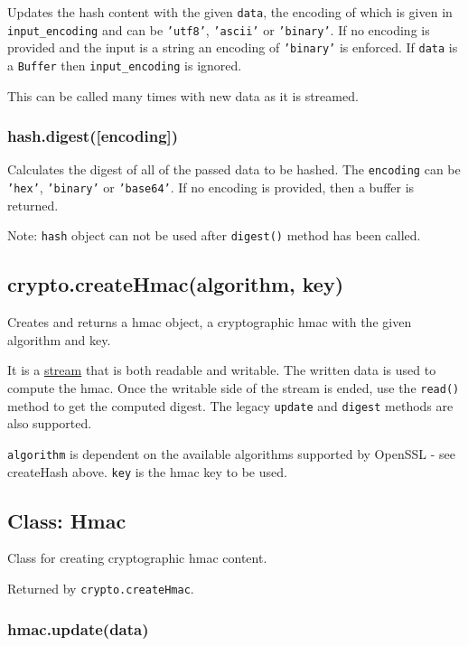 Updates the hash content with the given \texttt{data}, the encoding of
which is given in \texttt{input\_encoding} and can be \texttt{'utf8'},
\texttt{'ascii'} or \texttt{'binary'}. If no encoding is provided and
the input is a string an encoding of \texttt{'binary'} is enforced. If
\texttt{data} is a \texttt{Buffer} then \texttt{input\_encoding} is
ignored.

This can be called many times with new data as it is streamed.

\subsubsection{hash.digest({[}encoding{]})}\label{hash.digestencoding}

Calculates the digest of all of the passed data to be hashed. The
\texttt{encoding} can be \texttt{'hex'}, \texttt{'binary'} or
\texttt{'base64'}. If no encoding is provided, then a buffer is
returned.

Note: \texttt{hash} object can not be used after \texttt{digest()}
method has been called.

\subsection{crypto.createHmac(algorithm,
key)}\label{crypto.createhmacalgorithm-key}

Creates and returns a hmac object, a cryptographic hmac with the given
algorithm and key.

It is a \href{stream.html}{stream} that is both readable and writable.
The written data is used to compute the hmac. Once the writable side of
the stream is ended, use the \texttt{read()} method to get the computed
digest. The legacy \texttt{update} and \texttt{digest} methods are also
supported.

\texttt{algorithm} is dependent on the available algorithms supported by
OpenSSL - see createHash above. \texttt{key} is the hmac key to be used.

\subsection{Class: Hmac}\label{class-hmac}

Class for creating cryptographic hmac content.

Returned by \texttt{crypto.createHmac}.

\subsubsection{hmac.update(data)}\label{hmac.updatedata}

